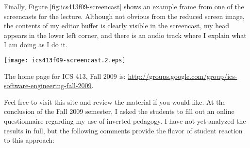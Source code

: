 \documentclass[11pt]{article}
\begin{document}
Finally, Figure \ref{fig:ics413f09-screencast} shows an example frame from
one of the screencasts for the lecture.  Although not obvious from the
reduced screen image, the contents of my editor buffer is clearly visible
in the screencast, my head appears in the lower left corner, and there is
an audio track where I explain what I am doing as I do it. 

\begin{figure*}[ht]
  \center
  \texttt{[image: ics413f09-screencast.2.eps]}
  \caption{ICS 413, Fall 2009 example screencast frame}
  \label{fig:ics413f09-screencast}
\end{figure*}  

The home page for ICS 413, Fall 2009 is: \newline
\url{http://groups.google.com/group/ics-software-engineering-fall-2009}.

Feel free to visit this site and review the material if you would
like.  At the conclusion of the Fall 2009 semester, I asked the students to fill
out an online questionnaire regarding my use of inverted pedagogy.  I have
not yet analyzed the results in full, but the following comments provide
the flavor of student reaction to this approach:
\end{document}
